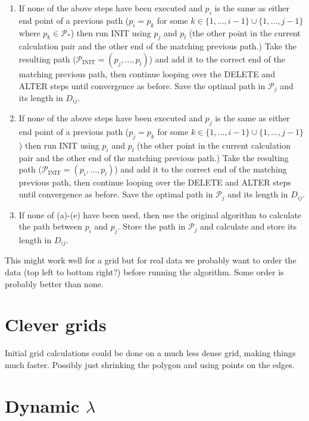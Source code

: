 \documentclass[a4paper,10pt]{article}
\begin{document}
\begin{enumerate}
\begin{enumerate}
\item If none of the above steps have been executed and $p_i$ is the same as either end point of a previous path ($p_i=p_{k}$ for some $k \in \{1,\dots, i-1\} \cup \{1,\dots, j-1\}$ where $p_k \in \mathcal{P}_*$) then run INIT using $p_j$ and $p_l$ (the other point in the current calculation pair and the other end of the matching previous path.) Take the resulting path ($\mathcal{P}_\text{INIT}=(p_j, \dots, p_l)$) and add it to the correct end of the matching previous path, then continue looping over the DELETE and ALTER steps until convergence as before. Save the optimal path in $\mathcal{P}_j$ and its length in $D_{ij}$.

\item If none of the above steps have been executed and $p_j$ is the same as either end point of a previous path ($p_j=p_{k}$ for some $k \in \{1,\dots, i-1\} \cup \{1,\dots, j-1\}$) then run INIT using $p_i$ and $p_l$ (the other point in the current calculation pair and the other end of the matching previous path.) Take the resulting path ($\mathcal{P}_\text{INIT}=(p_i, \dots, p_l)$) and add it to the correct end of the matching previous path, then continue looping over the DELETE and ALTER steps until convergence as before. Save the optimal path in $\mathcal{P}_j$ and its length in $D_{ij}$.

\item If none of (a)-(e) have been used, then use the original algorithm to calculate the path between $p_i$ and $p_j$. Store the path in $\mathcal{P}_{j}$ and calculate and store its length in $D_{ij}$.

\end{enumerate}
\end{enumerate}

This might work well for a grid but for real data we probably want to order the data (top left to bottom right?) before running the algorithm. Some order is probably better than none.



\section{Clever grids}

Initial grid calculations could be done on a much less dense grid, making things much faster. Possibly just shrinking the polygon and using points on the edges.

\section{Dynamic $\lambda$}
\end{document}
